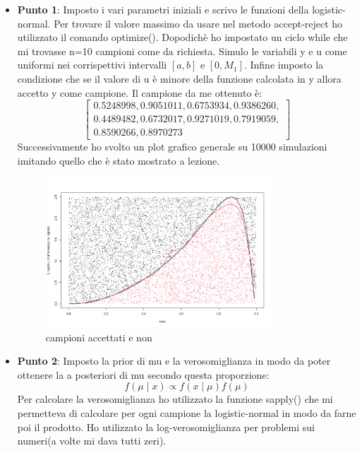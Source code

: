 \documentclass[a4paper,12pt]{article}
\begin{document}
\begin{itemize}
	\item \textbf{Punto 1}: Imposto i vari parametri iniziali e scrivo le funzioni della logistic-normal. Per trovare il valore massimo da usare nel metodo accept-reject ho utilizzato il comando optimize(). Dopodichè ho impostato un ciclo while che mi trovasse n=10 campioni come da richiesta. Simulo le variabili y e u come uniformi nei corrispettivi intervalli $[a,b] $ e $[0,M_1]$. Infine imposto la condizione che se il valore di u è minore della funzione calcolata in y allora accetto y come campione. Il campione da me ottenuto è:\\
	\[
	\left[
	\begin{array}{l}
		0.5248998, 0.9051011, 0.6753934, 0.9386260, \\
		0.4489482, 0.6732017, 0.9271019, 0.7919059, \\
		0.8590266, 0.8970273
	\end{array}
	\right]
	\]
	Successivamente ho svolto un plot grafico generale su 10000 simulazioni imitando quello che è stato mostrato a lezione.
	\begin{figure}[h] %
		\centering %
		\includegraphics[width=0.8\textwidth]{lognorm.png} %
		\caption{campioni accettati e non} %
		\label{fig:immagine} %
	\end{figure}
	\newpage
	\item \textbf{Punto 2}: Imposto la prior di mu e la verosomiglianza in modo da poter ottenere la a posteriori di mu secondo questa proporzione:
	\[
	f(\mu \mid x) \propto f(x \mid \mu) f(\mu)
	\]
	Per calcolare la verosomiglianza ho utilizzato la funzione sapply() che mi permetteva di calcolare per ogni campione la logistic-normal in modo da farne poi il prodotto. Ho utilizzato la log-verosomiglianza per problemi sui numeri(a volte mi dava tutti zeri).\\

\end{itemize}
\end{document}
